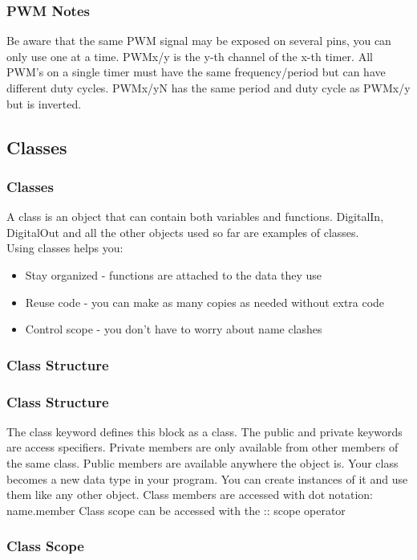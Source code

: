 \begin{frame}
	\frametitle{PWM Notes}
	Be aware that the same PWM signal may be exposed on several pins, you can only use one at a time.
	\vfill
	PWMx/y is the y-th channel of the x-th timer. All PWM's on a single timer must have the same frequency/period but can have different duty cycles.
	\vfill
	PWMx/yN has the same period and duty cycle as PWMx/y but is inverted.
\end{frame}

\subsection{Classes}
\label{sub:classes}
\begin{frame}
	\frametitle{Classes}
	A class is an object that can contain both variables and functions.
	DigitalIn, DigitalOut and all the other objects used so far are examples of classes.\\
	\vfill
	Using classes helps you:
	\begin{itemize}
		\item Stay organized - functions are attached to the data they use
		\item Reuse code - you can make as many copies as needed without extra code
		\item Control scope - you don't have to worry about name clashes
	\end{itemize}
\end{frame}

\begin{frame}[fragile]
	\frametitle{Class Structure}
	
\end{frame}

\begin{frame}[fragile]
	\frametitle{Class Structure}
	The {\ttfamily class} keyword defines this block as a class.
	\vfill
	The {\ttfamily public} and {\ttfamily private} keywords are access specifiers.
	Private members are only available from other members of the same class.
	Public members are available anywhere the object is.
	\vfill
	Your class becomes a new data type in your program.
	You can create instances of it and use them like any other object.
	\vfill
	Class members are accessed with dot notation: {\ttfamily name.member}
	\vfill
	Class scope can be accessed with the :: scope operator
\end{frame}

\begin{frame}[fragile]
	\frametitle{Class Scope}
	
\end{frame}

